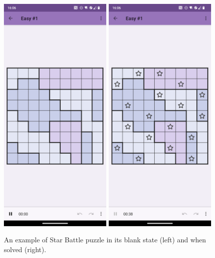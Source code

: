 \documentclass[titlepage]{article} %
\begin{document}
\begin{figure}[h]
    \centering
    \includegraphics[height=12cm]{Easy_1_blank.png}
    \includegraphics[height=12cm]{Easy_1_complete.png}
    \caption{An example of Star Battle puzzle in its blank state (left) and when solved (right).}\label{fig:example boards}
\end{figure}

\pagebreak
\printbibliography[heading=bibintoc, title={References}]
\end{document}
